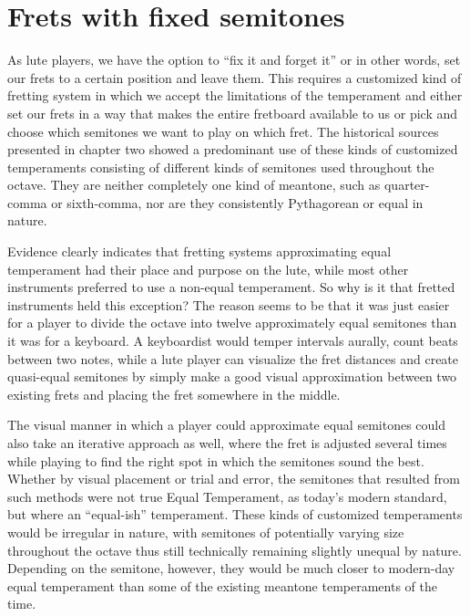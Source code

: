 \section{Frets with fixed semitones}

As lute players, we have the option to ``fix it and forget it'' or in other words, set
our frets to a certain position and leave them. This requires a customized kind of
fretting system in which we accept the limitations of the temperament and either set
our frets in a way that makes the entire fretboard available to us or pick and choose
which semitones we want to play on which fret. The historical sources presented in
chapter two showed a predominant use of these kinds of customized temperaments
consisting of different kinds of semitones used throughout the octave. They are neither
completely one kind of meantone, such as quarter-comma or sixth-comma, nor are they
consistently Pythagorean or equal in nature.

Evidence clearly indicates that fretting systems approximating equal temperament had
their place and purpose on the lute, while most other instruments preferred to use a
non-equal temperament.  So why is it that fretted instruments held this exception? The
reason seems to be that it was just easier for a player to divide the octave into
twelve approximately equal semitones than it was for a keyboard. A keyboardist would
temper intervals aurally, count beats between two notes, while a lute player can
visualize the fret distances and create quasi-equal semitones by simply make a good
visual approximation between two existing frets and placing the fret somewhere in the
middle.

The visual manner in which a player could approximate equal semitones could also take
an iterative approach as well, where the fret is adjusted several times while playing
to find the right spot in which the semitones sound the best. Whether by visual
placement or trial and error, the semitones that resulted from such methods were not
true Equal Temperament, as today's modern standard, but where an ``equal-ish''
temperament. These kinds of customized temperaments would be irregular in nature, with
semitones of potentially varying size throughout the octave thus still technically
remaining slightly unequal by nature. Depending on the semitone, however, they would be
much closer to modern-day equal temperament than some of the existing meantone
temperaments of the time.

